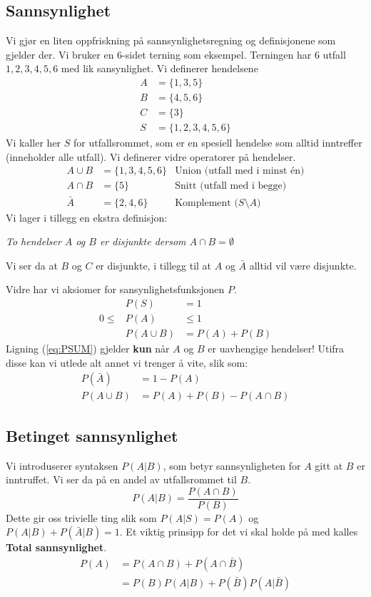 \documentclass[12pt,a4paper,norsk]{article}
\begin{document}
\begin{appendices}
\section{Sannsynlighet}
Vi gjør en liten oppfriskning på sannsynlighetsregning og definisjonene som
gjelder der. Vi bruker en 6-sidet terning som eksempel. Terningen har 6 utfall
${1,2,3,4,5,6}$ med lik sansynlighet. Vi definerer hendelsene
\begin{align*}
  A &= \{1,3,5\} \\
  B &= \{4,5,6\} \\
  C &= \{3\} \\
  S &= \{1,2,3,4,5,6\}
\end{align*}
Vi kaller her $S$ for utfallsrommet, som er en spesiell hendelse som alltid
inntreffer (inneholder alle utfall). Vi definerer vidre operatorer på hendelser.
\begin{align*}
  A \cup B &= \{1,3,4,5,6\} &\text{Union (utfall med i minst én)}\\
  A \cap B &= \{5\} &\text{Snitt (utfall med i begge)} \\
  \bar{A} &= \{2,4,6\} &\text{Komplement ($S \setminus A$)}
\end{align*}
Vi lager i tillegg en ekstra definisjon:
\begin{center}
  \textit{To hendelser $A$ og $B$ er disjunkte dersom $A \cap B = \emptyset$}
\end{center}
Vi ser da at $B$ og $C$ er disjunkte, i tillegg til at $A$ og $\bar{A}$ alltid
vil være disjunkte.

Vidre har vi aksiomer for sansynlighetsfunksjonen $P$.
\begin{align}
  &P(S) &= 1 \\
  0 \le &P(A) &\le 1 \\
  &P(A \cup B) &= P(A) + P(B) \label{eq:PSUM}
\end{align}
Ligning (\ref{eq:PSUM}) gjelder \textbf{kun} når $A$ og $B$ er uavhengige hendelser!
Utifra disse kan vi utlede alt annet vi trenger å vite, slik som:
\begin{align*}
  P(\bar{A}) &= 1-P(A) \\
  P(A \cup B) &= P(A) + P(B) - P(A \cap B)
\end{align*}

\subsection{Betinget sannsynlighet}
Vi introduserer syntaksen $P(A|B)$, som betyr sannsynligheten for $A$ gitt at
$B$ er inntruffet. Vi ser da på en andel av utfallsrommet til $B$.
\[P(A|B) = \frac{P(A \cap B)}{P(B)}\]
Dette gir oss trivielle ting slik som $P(A|S) = P(A)$ og $P(A|B)+P(\bar{A}|B)=1$.
Et viktig prinsipp for det vi skal holde på med kalles \textbf{Total sannsynlighet}.
\begin{align*}
  P(A) &= P(A \cap B) + P(A \cap \bar{B}) \\
       &= P(B)P(A|B) + P(\bar{B})P(A|\bar{B})
\end{align*}
\end{appendices}
\end{document}
